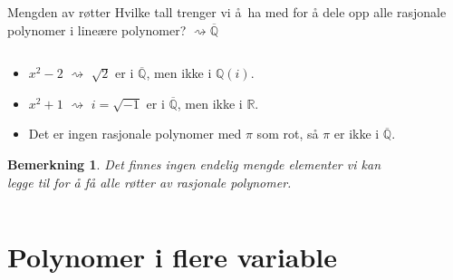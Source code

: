 \documentclass[norsk]{beamer}
\theoremstyle{example}
\newtheorem{remark}{Bemerkning}
\begin{document}
\begin{frame}{Mengden av røtter}
    Hvilke tall trenger vi å ha med for å dele opp alle rasjonale
    polynomer i lineære polynomer? $\rightsquigarrow \overline{\mathbb Q}$
    \begin{columns}
        \begin{column}{.6\textwidth}
            \begin{itemize}
                \item $x^2 - 2$ $\rightsquigarrow$ $\sqrt 2$ er i $\overline{\mathbb Q}$,
                    men ikke i $\mathbb Q(i)$.
                \item $x^2 + 1$ $\rightsquigarrow$ $i = \sqrt{-1}$ er i $\overline{\mathbb Q}$,
                    men ikke i $\mathbb R$.
                \item Det er ingen rasjonale polynomer med $\pi$ som rot,
                    så $\pi$ er ikke i $\overline{\mathbb Q}$.
            \end{itemize}
            \begin{remark}
                Det finnes ingen endelig mengde elementer vi kan legge til for å få alle
                røtter av rasjonale polynomer.
            \end{remark}
        \end{column}
        \begin{column}{.4\textwidth}
            \begin{figure}
                \centering
            \end{figure}
        \end{column}
    \end{columns}
\end{frame}

\section{Polynomer i flere variable}
\end{document}
